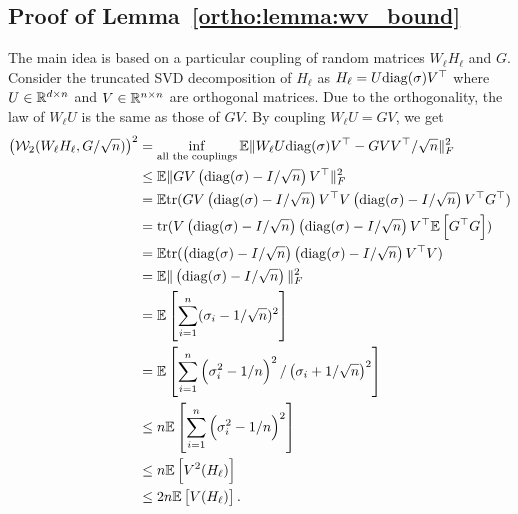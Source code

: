 \subsection*{Proof of Lemma~\ref{ortho:lemma:wv_bound}}
 The main idea is based on a particular coupling of random matrices $W_\ell H_\ell$ and $G$. Consider the truncated SVD decomposition of $H_\ell$ as $H_\ell = U \mathrm{diag}(\sigma) V^\top $ where $U \in \mathbb{R}^{d\times n}$ and $V \in \mathbb{R}^{n \times n}$ are orthogonal matrices. Due to the orthogonality, the law of $W_\ell U$ is the same as those of $G V $. By coupling $W_\ell U = G V$, we get 
 \begin{equation*}
 \begin{aligned}
     \left(\mathcal{W}_2(W_\ell H_\ell, G/\sqrt{n})\right)^2 & = \inf_{\text{all the couplings}}\mathbb{E} \|   W_\ell U \mathrm{diag}(\sigma) V^\top  - GVV^\top/\sqrt{n} \|_F^2 \\ 
     & \leq \mathbb{E} \| GV \left( \mathrm{diag}(\sigma) - I/\sqrt{n} \right) V^\top \|_F^2 \\ 
     & = \mathbb{E} \mathrm{tr}(GV \left( \mathrm{diag}(\sigma) - I/\sqrt{n} \right) V^\top V \left( \mathrm{diag}(\sigma) - I/\sqrt{n} \right) V^\top G^\top ) \\ 
     & =  \mathrm{tr}(V \left( \mathrm{diag}(\sigma) - I/\sqrt{n} \right) \left( \mathrm{diag}(\sigma) - I/\sqrt{n} \right) V^\top \mathbb{E} \left[ G^\top G \right] ) \\ 
     &= \mathbb{E} \mathrm{tr}( \left( \mathrm{diag}(\sigma) - I/\sqrt{n} \right) \left( \mathrm{diag}(\sigma) - I/\sqrt{n} \right) V^\top V )  \\ 
     &= \mathbb{E} \| \left( \mathrm{diag}(\sigma) - I/\sqrt{n} \right) \|_F^2 \\
     & = \mathbb{E} \left[  \sum_{i=1}^n (\sigma_i -1/\sqrt{n})^2 \right]  \\ 
 &= \mathbb{E} \left[  \sum_{i=1}^n \left(\sigma_i^2 -1/n\right)^2/\left(\sigma_i + 1/\sqrt{n}\right)^2 \right] \\
 & \leq n \mathbb{E} \left[  \sum_{i=1}^n \left(\sigma_i^2 -1/n\right)^2 \right] \\ 
 & \leq n \mathbb{E} \left[ V^2(H_\ell) \right] \\ 
 & \leq 2 n \mathbb{E} \left[ V(H_\ell) \right].
 \end{aligned}
 \end{equation*}
 
 

